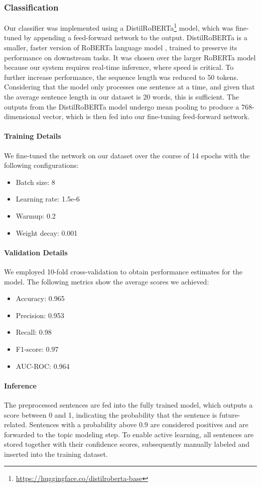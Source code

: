 \documentclass[sigconf]{acmart}
\begin{document}
\subsubsection{Classification}
Our classifier was implemented using a DistilRoBERTa\footnote{\url{https://huggingface.co/distilroberta-base}} model, which was fine-tuned by appending a feed-forward network to the output. DistilRoBERTa is a smaller, faster version of RoBERTa language model \cite{roberta}, trained to preserve its performance on downstream tasks. It was chosen over the larger RoBERTa model because our system requires real-time inference, where speed is critical. To further increase performance, the sequence length was reduced to 50 tokens. Considering that the model only processes one sentence at a time, and given that the average sentence length in our dataset is 20 words, this is sufficient.
The outputs from the DistilRoBERTa model undergo mean pooling to produce a 768-dimensional vector, which is then fed into our fine-tuning feed-forward network.

\paragraph{Training Details}
We fine-tuned the network on our dataset over the course of 14 epochs with the following configurations:
\begin{itemize}
    \item Batch size: 8
    \item Learning rate: 1.5e-6
    \item Warmup: 0.2
    \item Weight decay: 0.001
\end{itemize}

\paragraph{Validation Details}
We employed 10-fold cross-validation to obtain performance estimates for the model. The following metrics show the average scores we achieved:
\begin{itemize}
    \item Accuracy: 0.965
    \item Precision: 0.953
    \item Recall: 0.98
    \item F1-score: 0.97
    \item AUC-ROC: 0.964
\end{itemize}
\paragraph{Inference}
The preprocessed sentences are fed into the fully trained model, which outputs a score between 0 and 1, indicating the probability that the sentence is future-related. Sentences with a probability above 0.9 are considered positives and are forwarded to the topic modeling step. 
To enable active learning, all sentences are stored together with their confidence scores, subsequently manually labeled and inserted into the training dataset.
\end{document}
